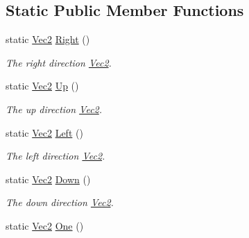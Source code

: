 \subsection*{Static Public Member Functions}
\begin{DoxyCompactItemize}
\item 
\hypertarget{classgofxmath_1_1_vec2_a303bfc61730279ddc16ff03fb6a80df3}{}static \hyperlink{classgofxmath_1_1_vec2}{Vec2} \hyperlink{classgofxmath_1_1_vec2_a303bfc61730279ddc16ff03fb6a80df3}{Right} ()\label{classgofxmath_1_1_vec2_a303bfc61730279ddc16ff03fb6a80df3}

\begin{DoxyCompactList}\small\item\em The right direction \hyperlink{classgofxmath_1_1_vec2}{Vec2}. \end{DoxyCompactList}\item 
\hypertarget{classgofxmath_1_1_vec2_aa092215329d9058bc940557300fb3011}{}static \hyperlink{classgofxmath_1_1_vec2}{Vec2} \hyperlink{classgofxmath_1_1_vec2_aa092215329d9058bc940557300fb3011}{Up} ()\label{classgofxmath_1_1_vec2_aa092215329d9058bc940557300fb3011}

\begin{DoxyCompactList}\small\item\em The up direction \hyperlink{classgofxmath_1_1_vec2}{Vec2}. \end{DoxyCompactList}\item 
\hypertarget{classgofxmath_1_1_vec2_aa67eb3cad4d0263d51738559ac2d04f1}{}static \hyperlink{classgofxmath_1_1_vec2}{Vec2} \hyperlink{classgofxmath_1_1_vec2_aa67eb3cad4d0263d51738559ac2d04f1}{Left} ()\label{classgofxmath_1_1_vec2_aa67eb3cad4d0263d51738559ac2d04f1}

\begin{DoxyCompactList}\small\item\em The left direction \hyperlink{classgofxmath_1_1_vec2}{Vec2}. \end{DoxyCompactList}\item 
\hypertarget{classgofxmath_1_1_vec2_a6d9b1ac0a454ea198547bbf21b7b4438}{}static \hyperlink{classgofxmath_1_1_vec2}{Vec2} \hyperlink{classgofxmath_1_1_vec2_a6d9b1ac0a454ea198547bbf21b7b4438}{Down} ()\label{classgofxmath_1_1_vec2_a6d9b1ac0a454ea198547bbf21b7b4438}

\begin{DoxyCompactList}\small\item\em The down direction \hyperlink{classgofxmath_1_1_vec2}{Vec2}. \end{DoxyCompactList}\item 
\hypertarget{classgofxmath_1_1_vec2_a48fb8bacc181a011e8cd7f7d5c093c56}{}static \hyperlink{classgofxmath_1_1_vec2}{Vec2} \hyperlink{classgofxmath_1_1_vec2_a48fb8bacc181a011e8cd7f7d5c093c56}{One} ()\label{classgofxmath_1_1_vec2_a48fb8bacc181a011e8cd7f7d5c093c56}


\end{DoxyCompactItemize}
